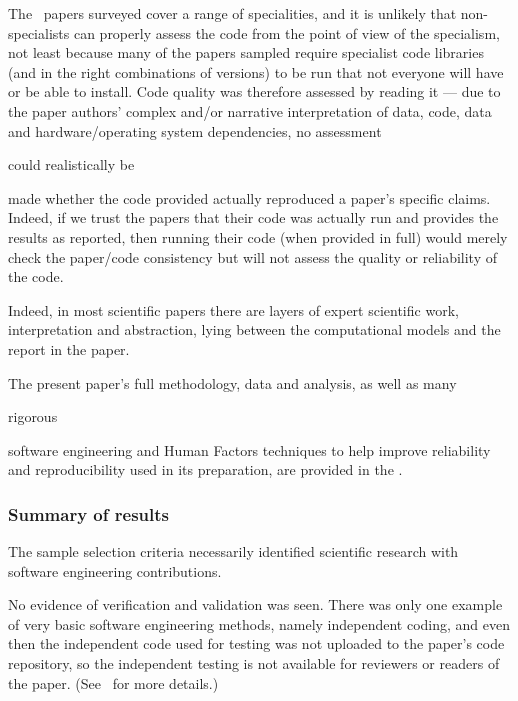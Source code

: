 The \the\dataN\ papers surveyed cover a range of specialities, and it is unlikely that non-specialists can properly assess the code from the point of view of the specialism, not least because many of the papers sampled require specialist code libraries (and in the right combinations of versions) to be run that not everyone will have or be able to install. Code quality was therefore assessed by reading it --- due to the paper authors' complex and/or narrative interpretation of data, code, data and hardware/operating system dependencies, no assessment \begin{change}could realistically be\end{change} made whether the code provided actually reproduced a paper's specific claims. Indeed, if we trust the papers that their code was actually run and provides the results as reported, then running their code (when provided in full) would merely check the paper/code consistency but will not assess the quality or reliability of the code. \begin{change}Indeed, in most scientific papers there are layers of expert scientific work, interpretation and abstraction, lying between the computational models and the report in the paper.\end{change}

The present paper's full methodology, data and analysis, as well as many \begin{change}rigorous\end{change} software engineering and Human Factors techniques to help improve reliability and reproducibility used in its preparation, are provided in the \supplement. 


\subsubsection{Summary of results}
\label{summary-of-results}
The sample selection criteria necessarily identified scientific research with software engineering contributions. 

No evidence of verification and validation was seen. There was only one example of very basic software engineering methods, namely independent coding, and even then the independent code used for testing was not uploaded to the paper's code repository, so the independent testing is not available for reviewers or readers of the paper. (See \supplement\ for more details.)

